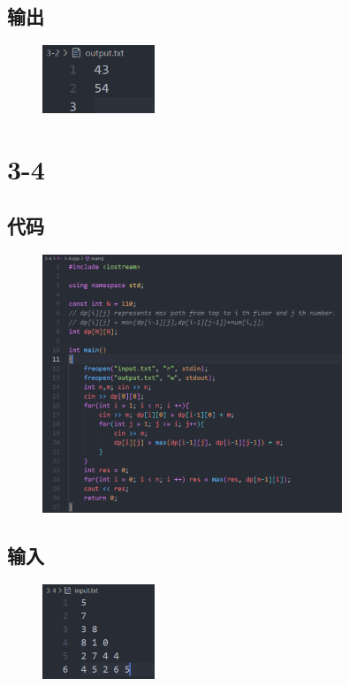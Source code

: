 \documentclass[11pt]{article}  %
\begin{document}
\subsection*{输出}

    \begin{figure}[H]
        \centering
        \includegraphics[width = 0.3\textwidth]{pic/3-2out.png}
    \end{figure}

\section*{3-4}

\subsection*{代码}

    \begin{figure}[H]
        \centering
        \includegraphics[width = 0.8\textwidth]{pic/3-4.png}
    \end{figure}

\subsection*{输入}

    \begin{figure}[H]
        \centering
        \includegraphics[width = 0.3\textwidth]{pic/3-4in.png}
    \end{figure}
\end{document}
